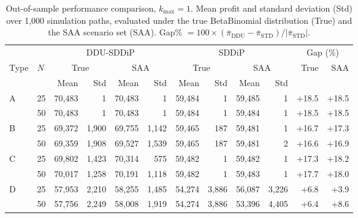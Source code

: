 \begin{table}[ht]
\centering
\caption{Out-of-sample performance comparison, $k_{\max}=1$. Mean profit and standard deviation (Std) over 1{,}000 simulation paths, evaluated under the true BetaBinomial distribution (True) and the SAA scenario set (SAA). Gap\% $= 100\times(\bar\pi_{\text{DDU}} - \bar\pi_{\text{STD}})/|\bar\pi_{\text{STD}}|$.}
\label{tab:perf_k1}
\small
\begin{tabular}{ll rr rr rr rr rr}
\toprule
 & & \multicolumn{4}{c}{DDU-SDDiP} & \multicolumn{4}{c}{SDDiP} & \multicolumn{2}{c}{Gap (\%)} \\
\cmidrule(lr){3-6}\cmidrule(lr){7-10}\cmidrule(lr){11-12}
Type & $N$ & \multicolumn{2}{c}{True} & \multicolumn{2}{c}{SAA} & \multicolumn{2}{c}{True} & \multicolumn{2}{c}{SAA} & True & SAA \\
\cmidrule(lr){3-4}\cmidrule(lr){5-6}\cmidrule(lr){7-8}\cmidrule(lr){9-10}
& & Mean & Std & Mean & Std & Mean & Std & Mean & Std & & \\
\midrule
A & 25 & 70,483 & 1 & 70,483  & 1 & 59,484 & 1 & 59,485  & 1 & +18.5 & +18.5 \\
 & 50 & 70,483 & 1 & 70,483  & 1 & 59,484 & 1 & 59,484  & 1 & +18.5 & +18.5 \\
\midrule
B & 25 & 69,372 & 1,900 & 69,755  & 1,142 & 59,465 & 187 & 59,481  & 1 & +16.7 & +17.3 \\
 & 50 & 69,359 & 1,908 & 69,527  & 1,539 & 59,465 & 187 & 59,481  & 2 & +16.6 & +16.9 \\
\midrule
C & 25 & 69,802 & 1,423 & 70,314  & 575 & 59,482 & 1 & 59,482  & 1 & +17.3 & +18.2 \\
 & 50 & 70,017 & 1,258 & 70,191  & 1,118 & 59,482 & 1 & 59,483  & 1 & +17.7 & +18.0 \\
\midrule
D & 25 & 57,953 & 2,210 & 58,255  & 1,485 & 54,274 & 3,886 & 56,087  & 3,226 & +6.8 & +3.9 \\
 & 50 & 57,756 & 2,249 & 58,008  & 1,919 & 54,274 & 3,886 & 53,396  & 4,405 & +6.4 & +8.6 \\
\bottomrule
\end{tabular}
\end{table}